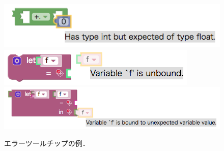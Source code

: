 \begin{figure}[h]
 \centering
 \includegraphics[keepaspectratio, scale=0.4]{img/errorIntFloat.png}
 \includegraphics[keepaspectratio, scale=0.4]{img/errorUnbound.png}
  \includegraphics[keepaspectratio, scale=0.4]{img/errorDupVar.png}
 \caption{エラーツールチップの例．\label{fig:errorOutput}}
\end{figure}


